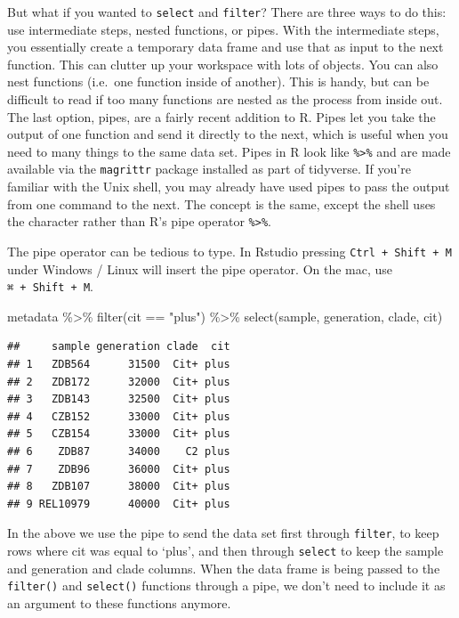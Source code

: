 \documentclass[
]{book}
\newenvironment{Shaded}{\begin{snugshade}}{\end{snugshade}}
\newcommand{\FunctionTok}[1]{\textcolor[rgb]{0.00,0.00,0.00}{#1}}
\newcommand{\NormalTok}[1]{#1}
\newcommand{\SpecialCharTok}[1]{\textcolor[rgb]{0.00,0.00,0.00}{#1}}
\newcommand{\StringTok}[1]{\textcolor[rgb]{0.31,0.60,0.02}{#1}}
\begin{document}
But what if you wanted to \texttt{select} and \texttt{filter}? There are three ways to do this: use intermediate steps, nested functions, or pipes. With the intermediate steps, you essentially create a temporary data frame and use that as input to the next function. This can clutter up your workspace with lots of objects. You can also nest functions (i.e.~one function inside of another). This is handy, but can be difficult to read if too many functions are nested as the process from inside out. The last option, pipes, are a fairly recent addition to R. Pipes let you take the output of one function and send it directly to the next, which is useful when you need to many things to the same data set. Pipes in R look like \texttt{\%\textgreater{}\%} and are made available via the \texttt{magrittr} package installed as part of tidyverse. If you're familiar with the Unix shell, you may already have used pipes to pass the output from one command to the next. The concept is the same, except the shell uses the \texttt{\textbar{}} character rather than R's pipe operator \texttt{\%\textgreater{}\%}.

The pipe operator can be tedious to type. In Rstudio pressing \texttt{Ctrl\ +\ Shift\ +\ M} under Windows / Linux will insert the pipe operator. On the mac, use \texttt{⌘\ +\ Shift\ +\ M}.

\begin{Shaded}
\begin{Highlighting}[]
\NormalTok{metadata }\SpecialCharTok{\%\textgreater{}\%}
  \FunctionTok{filter}\NormalTok{(cit }\SpecialCharTok{==} \StringTok{"plus"}\NormalTok{) }\SpecialCharTok{\%\textgreater{}\%}
  \FunctionTok{select}\NormalTok{(sample, generation, clade, cit)}
\end{Highlighting}
\end{Shaded}

\begin{verbatim}
##     sample generation clade  cit
## 1   ZDB564      31500  Cit+ plus
## 2   ZDB172      32000  Cit+ plus
## 3   ZDB143      32500  Cit+ plus
## 4   CZB152      33000  Cit+ plus
## 5   CZB154      33000  Cit+ plus
## 6    ZDB87      34000    C2 plus
## 7    ZDB96      36000  Cit+ plus
## 8   ZDB107      38000  Cit+ plus
## 9 REL10979      40000  Cit+ plus
\end{verbatim}

In the above we use the pipe to send the data set first through \texttt{filter}, to keep rows where cit was equal to `plus', and then through \texttt{select} to keep the sample and generation and clade columns. When the data frame is being passed to the \texttt{filter()} and \texttt{select()} functions through a pipe, we don't need to include it as an argument to these functions anymore.
\end{document}
